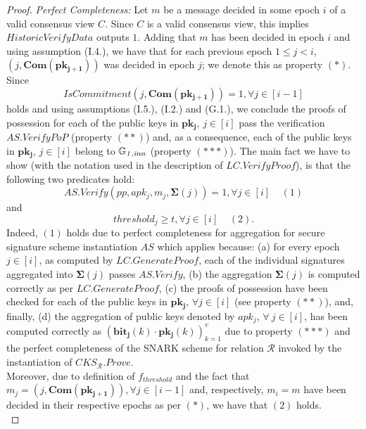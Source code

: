 \begin{proof} 
\noindent \textit{Perfect Completeness:}  Let $m$ be a message decided in some epoch $i$ of a valid consensus view $C$. 
Since $C$ is a valid consensus view, this implies $\mathit{HistoricVerifyData}$ outputs $1$. Adding that $m$ has been decided in epoch $i$ 
and using assumption (I.4.), we have that for each previous epoch $1 \leq j < i$, $(j, \mathbf{Com}(\mathbf{pk_{j+1}}))$ 
was decided in epoch $j$; we denote this as property $(\ast)$. Since $$\mathit{IsCommitment}(j, \mathbf{Com}(\mathbf{pk_{j+1}})) = 1, \forall j \in [i-1]$$  
holds and using assumptions (I.5.), (I.2.) and (G.1.), we conclude the proofs of possession for each of the public keys in 
$\mathbf{pk_{j}}$, $j  \in [i]$ pass the verification $\mathit{AS.VerifyPoP}$ (property $(**)$) and, as a consequence, each of the public keys in $\mathbf{pk_{j}}$, $j  \in [i]$ belong to $\mathbb{G}_{\mathit{1,inn}}$ (property $(***)$). 
The main fact we have to show (with the notation used in the description of 
$\mathit{LC.VerifyProof}$), is that the following two predicates hold:
$$\mathit{AS.Verify}(\mathit{pp}, \mathit{apk_j}, m_j, \mathbf{\Sigma}(j)) = 1, \forall j \in [i]  \ \ \ \ \ (1)$$ 
and 
$$\mathit{threshold_j} \geq t, \forall j \in [i] \ \ \ \ \ (2).$$
\noindent Indeed, $(1)$ holds due to perfect completeness for aggregation for secure signature scheme instantiation 
$\mathit{AS}$ which applies because: (a) for every epoch $j \in [i]$, as computed by $\mathit{LC.GenerateProof}$, 
each of the individual signatures aggregated into $\mathbf{\Sigma}(j)$ passes $\mathit{AS.Verify}$, (b)
the aggregation $\mathbf{\Sigma}(j)$ is computed correctly as per $\mathit{LC.GenerateProof}$, (c) the proofs of possession have been checked 
for each of the public keys in $\mathbf{pk_{j}}$, $\forall j  \in [i]$ (see property $(**)$), and, finally, (d) the aggregation of public 
keys denoted by $\mathit{apk_j}$, $\forall \ j \in [i]$, has been computed correctly as $(\mathbf{bit_j}(k) \cdot \mathbf{pk_j}(k))_{k=1}^{v}$ 
due to property $(***)$ and the perfect completeness of the SNARK scheme for relation $\mathcal{R}$ invoked by the instantiation of 
$\mathit{CKS}_{\mathcal{R}}.\mathit{Prove}$. \\
Moreover, due to definition of $f_{\mathit{threshold}}$ and the fact that 
$m_j = (j, \mathbf{Com}(\mathbf{pk_{j+1}})), \forall j \in [i-1]$ and, respectively,  $m_i = m$ have been 
decided in their respective epochs as per $(*)$, we have that $(2)$ holds. \\


\end{proof}
